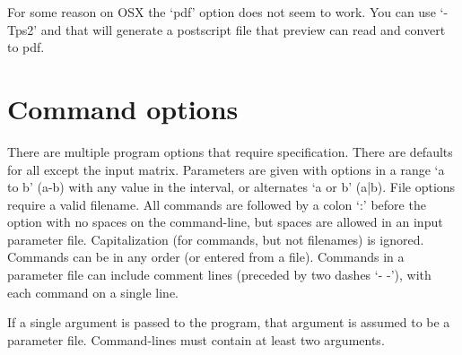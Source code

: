 \documentclass[11pt]{memoir}
\begin{document}
	For some reason on OSX the `pdf' option does not seem to work.  You can use `-Tps2' and that will generate a postscript file that preview can read and convert to pdf.
	
	\section{Command options}
	There are multiple program options that require specification.  There are defaults for all except the input matrix.  
	Parameters are given with options in a range `a to b' (a-b) with any value in the interval, or alternates `a or b' (a|b). File options require a valid filename.
	All commands are followed by a colon `:' before the option with no spaces on the command-line, but spaces are allowed in an input parameter file.  Capitalization (for commands, but not filenames) is ignored.  Commands can be in any order (or entered from a file).  Commands in a 
	parameter file can include comment lines (preceded by two dashes `- -'), with each command on a single line.
	
	If a single argument is passed to the program, that argument is assumed to be a parameter file.  Command-lines must contain at least two 
	arguments.
\end{document}
